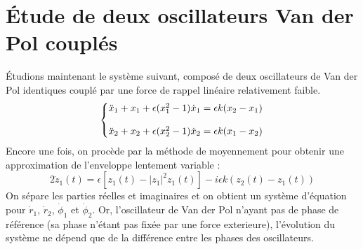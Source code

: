 \chapter{Étude de deux oscillateurs Van der Pol couplés}
%
Étudions maintenant le système suivant, composé de deux oscillateurs de Van der Pol identiques couplé par une force de rappel linéaire relativement faible.
%
\begin{equation}
  \left\{\begin{array}{@{}l@{}}
    \ddot{x}_1 + x_1  + \epsilon(x_1^2 - 1)\dot{x}_1 = \epsilon k(x_2 - x_1) \\
    \\
    \ddot{x}_2 + x_2 + \epsilon(x_2^2 - 1)\dot{x}_2 = \epsilon k(x_1 - x_2)
  \end{array}\right.\,
  \label{eq:coupled_vdp}
\end{equation}
%
Encore une fois, on procède par la méthode de moyennement pour obtenir une approximation de l'enveloppe lentement variable :
%
\begin{equation}
    2\dot{z}_1(t) = 
     \epsilon \left[ z_1(t) - |z_1|^2z_1(t) \right]
    - i\epsilon k\left( z_2(t) - z_1(t)\right)
\end{equation}
%
On sépare les parties réelles et imaginaires et on obtient un système d'équation pour $\dot{r}_1$,  $\dot{r}_2$,  $\dot{\phi}_1$ et  $\dot{\phi}_2$. %
%
%
%
%
Or, l'oscillateur de Van der Pol n'ayant pas de phase de référence (sa phase n'étant pas fixée par une force exterieure), 
l'évolution du système ne dépend que de la différence entre les phases des oscillateurs. 
